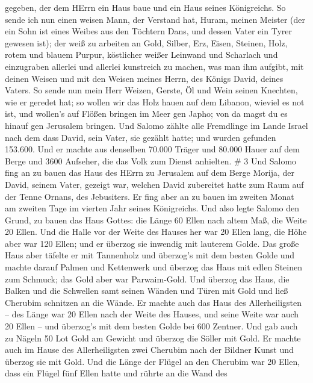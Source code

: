 gegeben, der dem HErrn ein Haus baue und ein Haus seines Königreichs.
 So sende ich nun einen weisen Mann, der Verstand hat,
Huram, meinen Meister  (der ein Sohn ist eines Weibes aus
den Töchtern Dans, und dessen Vater ein Tyrer gewesen ist); der weiß zu
arbeiten an Gold, Silber, Erz, Eisen, Steinen, Holz, rotem und blauem
Purpur, köstlicher weißer Leinwand und Scharlach und einzugraben
allerlei und allerlei kunstreich zu machen, was man ihm aufgibt, mit
deinen Weisen und mit den Weisen meines Herrn, des Königs David, deines
Vaters.  So sende nun mein Herr Weizen, Gerste, Öl und Wein
seinen Knechten, wie er geredet hat;  so wollen wir das
Holz hauen auf dem Libanon, wieviel es not ist, und wollen's auf Flößen
bringen im Meer gen Japho; von da magst du es hinauf gen Jerusalem
bringen.  Und Salomo zählte alle Fremdlinge im Lande Israel
nach dem dass David, sein Vater, sie gezählt hatte; und wurden gefunden
153.600.  Und er machte aus denselben 70.000 Träger und
80.000 Hauer auf dem Berge und 3600 Aufseher, die das Volk zum Dienst
anhielten. \# 3  Und Salomo fing an zu bauen das Haus des
HErrn zu Jerusalem auf dem Berge Morija, der David, seinem Vater,
gezeigt war, welchen David zubereitet hatte zum Raum auf der Tenne
Ornans, des Jebusiters.  Er fing aber an zu bauen im zweiten
Monat am zweiten Tage im vierten Jahr seines Königreichs. 
Und also legte Salomo den Grund, zu bauen das Haus Gottes: die Länge 60
Ellen nach altem Maß, die Weite 20 Ellen.  Und die Halle vor
der Weite des Hauses her war 20 Ellen lang, die Höhe aber war 120 Ellen;
und er überzog sie inwendig mit lauterem Golde.  Das große
Haus aber täfelte er mit Tannenholz und überzog's mit dem besten Golde
und machte darauf Palmen und Kettenwerk  und überzog das
Haus mit edlen Steinen zum Schmuck; das Gold aber war Parwaim-Gold.
 Und überzog das Haus, die Balken und die Schwellen samt
seinen Wänden und Türen mit Gold und ließ Cherubim schnitzen an die
Wände.  Er machte auch das Haus des Allerheiligsten -- des
Länge war 20 Ellen nach der Weite des Hauses, und seine Weite war auch
20 Ellen -- und überzog's mit dem besten Golde bei 600 Zentner.
 Und gab auch zu Nägeln 50 Lot Gold am Gewicht und überzog
die Söller mit Gold.  Er machte auch im Hause des
Allerheiligsten zwei Cherubim nach der Bildner Kunst und überzog sie mit
Gold.  Und die Länge der Flügel an den Cherubim war 20
Ellen, dass ein Flügel fünf Ellen hatte und rührte an die Wand des
